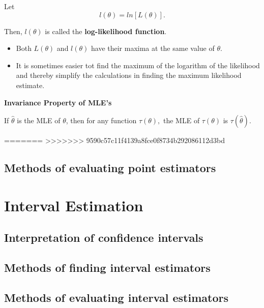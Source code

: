 \documentclass[]{book}
\providecommand{\tightlist}{%
  \setlength{\itemsep}{0pt}\setlength{\parskip}{0pt}}
\begin{document}
Let \[l(\theta) = ln[L(\theta)].\]

Then, \(l(\theta)\) is called the \textbf{log-likelihood function}.

\begin{itemize}
\tightlist
\item
  Both \(L(\theta)\) and \(l(\theta)\) have their maxima at the same value of \(\theta\).
\item
  It is sometimes easier tot find the maximum of the logarithm of the likelihood and thereby simplify the calculations in finding the maximum likelihood estimate.
\end{itemize}

\textbf{Invariance Property of MLE's}

If \(\hat{\theta}\) is the MLE of \(\theta\), then for any function \(\tau(\theta),\) the MLE of \(\tau(\theta)\) is \(\tau(\hat{\theta}).\)

=======
>>>>>>> 9590c57c11f4139a8fce0f8734b292086112d3bd
\newpage

\hypertarget{methods-of-evaluating-point-estimators}{%
\subsection{Methods of evaluating point estimators}\label{methods-of-evaluating-point-estimators}}

\hypertarget{interval-estimation}{%
\section{Interval Estimation}\label{interval-estimation}}

\hypertarget{interpretation-of-confidence-intervals}{%
\subsection{Interpretation of confidence intervals}\label{interpretation-of-confidence-intervals}}

\hypertarget{methods-of-finding-interval-estimators}{%
\subsection{Methods of finding interval estimators}\label{methods-of-finding-interval-estimators}}

\hypertarget{methods-of-evaluating-interval-estimators}{%
\subsection{Methods of evaluating interval estimators}\label{methods-of-evaluating-interval-estimators}}
\end{document}

